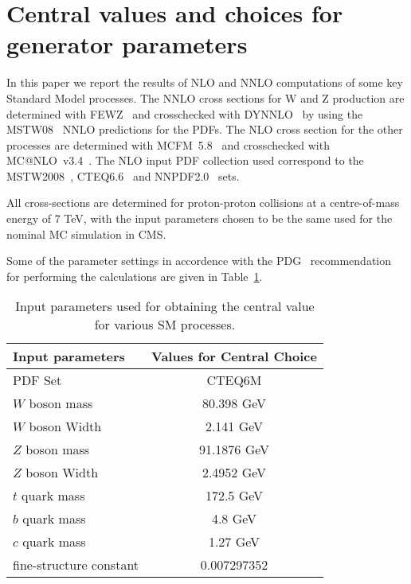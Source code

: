 \section{Central values and choices for generator parameters}
\label{sec:assumptions}

In this paper we report the results of NLO and NNLO computations of some
key Standard Model processes. The NNLO cross sections for W and Z production
are determined with FEWZ~\cite{fewz} and crosschecked with DYNNLO~\cite{dynnlo} 
by using the MSTW08~\cite{mstw08} NNLO predictions for the PDFs.
The NLO 
cross section for the other processes are determined with MCFM~5.8~\cite{mcfm:w} 
and crosschecked with MC@NLO~v3.4~\cite{mcatnlo}. The NLO input PDF collection 
used correspond to the MSTW2008~\cite{mstw08}, CTEQ6.6~\cite{cteq66} and 
NNPDF2.0~\cite{nnpdf} sets. 

All cross-sections are determined for proton-proton collisions at 
a centre-of-mass energy of 7 TeV, with the input parameters chosen to be
the same used for the nominal MC simulation in CMS.

Some of the parameter settings in accordence with the PDG~\cite{pdg} 
recommendation for performing the calculations are given in 
Table~\ref{tab:input_params}.

\vspace{0.9mm}
\begin{table}[hbt]
\begin{center}
\renewcommand{\arraystretch}{1.2}
\begin{tabular}{|l|c|}\hline
Input parameters & Values for Central Choice \\ \hline
PDF Set & CTEQ6M \\ \hline
$W$ boson mass & 80.398 GeV \\ \hline	
$W$ boson Width & 2.141 GeV \\ \hline	
$Z$ boson mass & 91.1876 GeV \\ \hline	
$Z$ boson Width & 2.4952 GeV \\ \hline	
$t$ quark mass & 172.5 GeV \\ \hline	
$b$ quark mass & 4.8 GeV \\ \hline	
$c$ quark mass & 1.27 GeV \\ \hline	
fine-structure constant &  0.007297352 \\ \hline	
\end{tabular} 
\caption{Input parameters used for obtaining the central value for various 
SM processes.\label{tab:input_params}}
\end{center}
\end{table}

